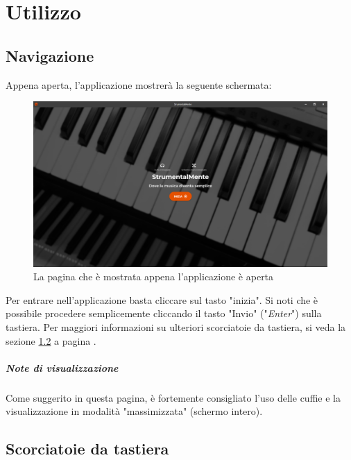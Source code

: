 \chapter{Utilizzo}
\section{Navigazione}
Appena aperta, l'applicazione mostrerà la seguente schermata:
\begin{figure}[H]
	\centering
	\caption[La pagina iniziale]{La pagina che è mostrata appena l'applicazione è aperta}
	\label{fig:landing-page}
	\includegraphics[width=\textwidth]{images/landing-page}
\end{figure}
Per entrare nell'applicazione basta cliccare sul tasto "inizia". Si noti che è possibile procedere semplicemente cliccando il tasto "Invio" ("\textit{Enter}") sulla tastiera. Per maggiori informazioni su ulteriori scorciatoie da tastiera, si veda la sezione \ref{sec:shortcuts} a pagina \pageref{sec:shortcuts}.
\paragraph{Note di visualizzazione} Come suggerito in questa pagina, è fortemente consigliato l'uso delle cuffie e la visualizzazione in modalità "massimizzata" (schermo intero).
\section{Scorciatoie da tastiera}\label{sec:shortcuts}